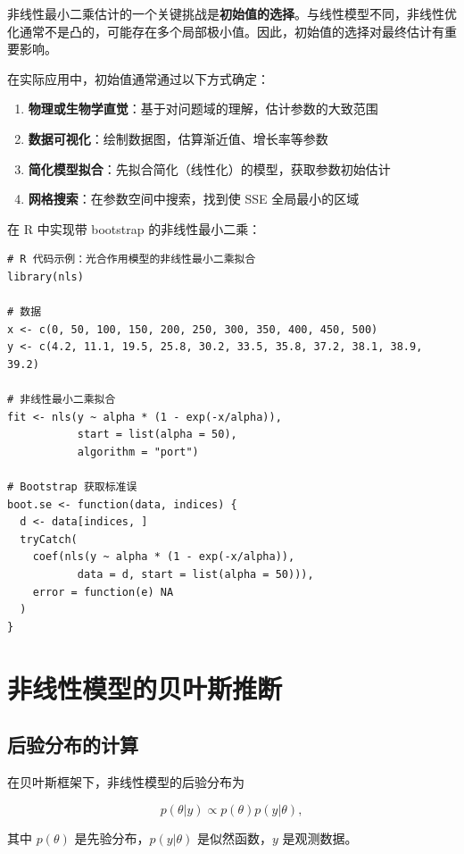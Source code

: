 非线性最小二乘估计的一个关键挑战是\textbf{初始值的选择}。与线性模型不同，非线性优化通常不是凸的，可能存在多个局部极小值。因此，初始值的选择对最终估计有重要影响。

在实际应用中，初始值通常通过以下方式确定：

\begin{enumerate}
  \item \textbf{物理或生物学直觉}：基于对问题域的理解，估计参数的大致范围
  \item \textbf{数据可视化}：绘制数据图，估算渐近值、增长率等参数
  \item \textbf{简化模型拟合}：先拟合简化（线性化）的模型，获取参数初始估计
  \item \textbf{网格搜索}：在参数空间中搜索，找到使 SSE 全局最小的区域
\end{enumerate}

在 R 中实现带 bootstrap 的非线性最小二乘：

\begin{verbatim}
# R 代码示例：光合作用模型的非线性最小二乘拟合
library(nls)

# 数据
x <- c(0, 50, 100, 150, 200, 250, 300, 350, 400, 450, 500)
y <- c(4.2, 11.1, 19.5, 25.8, 30.2, 33.5, 35.8, 37.2, 38.1, 38.9, 39.2)

# 非线性最小二乘拟合
fit <- nls(y ~ alpha * (1 - exp(-x/alpha)),
           start = list(alpha = 50),
           algorithm = "port")

# Bootstrap 获取标准误
boot.se <- function(data, indices) {
  d <- data[indices, ]
  tryCatch(
    coef(nls(y ~ alpha * (1 - exp(-x/alpha)),
           data = d, start = list(alpha = 50))),
    error = function(e) NA
  )
}
\end{verbatim}

\section{非线性模型的贝叶斯推断}

\subsection{后验分布的计算}

在贝叶斯框架下，非线性模型的后验分布为

\begin{equation}
p(\theta | y) \propto p(\theta) p(y | \theta), \label{eq:nonlinear-posterior}
\end{equation}

其中 $p(\theta)$ 是先验分布，$p(y | \theta)$ 是似然函数，$y$ 是观测数据。

